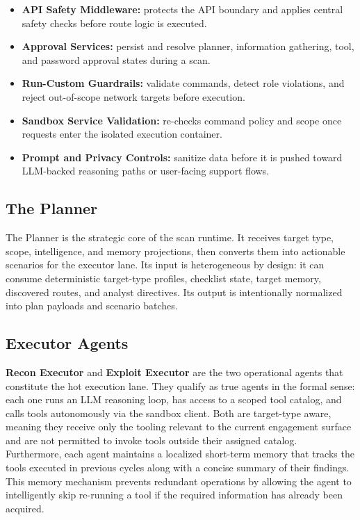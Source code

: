\documentclass[12pt,a4paper]{report}
\begin{document}
\begin{itemize}
    \item \textbf{API Safety Middleware:} protects the API boundary and applies
    central safety checks before route logic is executed.
    \item \textbf{Approval Services:} persist and resolve planner, information
    gathering, tool, and password approval states during a scan.
    \item \textbf{Run-Custom Guardrails:} validate commands, detect role violations,
    and reject out-of-scope network targets before execution.
    \item \textbf{Sandbox Service Validation:} re-checks command policy and scope
    once requests enter the isolated execution container.
    \item \textbf{Prompt and Privacy Controls:} sanitize data before it is pushed
    toward LLM-backed reasoning paths or user-facing support flows.
\end{itemize}

\subsection{The Planner}

The Planner is the strategic core of the scan runtime. It receives target type,
scope, intelligence, and memory projections, then converts them into actionable
scenarios for the executor lane. Its input is heterogeneous by design: it can
consume deterministic target-type profiles, checklist state, target memory,
discovered routes, and analyst directives. Its output is intentionally normalized
into plan payloads and scenario batches.

\subsection{Executor Agents}

\textbf{Recon Executor} and \textbf{Exploit Executor} are the two operational agents that constitute the hot execution lane. They qualify as true agents in the formal sense: each one runs an LLM reasoning loop, has access to a scoped tool catalog, and calls tools autonomously via the sandbox client. Both are target-type aware, meaning they receive only the tooling relevant to the current engagement surface and are not permitted to invoke tools outside their assigned catalog. Furthermore, each agent maintains a localized short-term memory that tracks the tools executed in previous cycles along with a concise summary of their findings. This memory mechanism prevents redundant operations by allowing the agent to intelligently skip re-running a tool if the required information has already been acquired.
\end{document}
